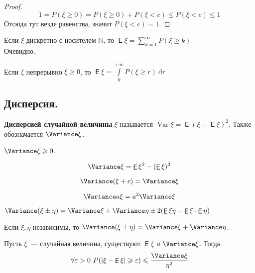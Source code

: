 \documentclass{article}
\DeclareMathOperator{\Expected}{\mathsf{E}}
\begin{document}
    \begin{proof}
        $$
        1=P(\xi\geqslant0)=P(\xi\geqslant0)+P(\xi<c)\leqslant P(\xi<c)\leqslant 1
        $$
        Отсюда тут везде равенства, значит $P(\xi<c)=1$.
    \end{proof}
    \begin{property}
        Если $\xi$ дискретно с носителем $\mathbb N$, то $\Expected\xi=\sum\limits_{k=1}^\infty P(\xi\geqslant k)$.\\
        Очевидно.
    \end{property}
    \begin{property}
        Если $\xi$ непрерывно $\xi\geqslant0$, то $\Expected\xi=\int\limits_0^{+\infty} P(\xi\geqslant r)~\mathrm dr$
    \end{property}
    \subsection{Дисперсия.}
    \begin{definition}
        \textbf{Дисперсией случайной величины} $\xi$ называется $\operatorname{Var}\xi=\Expected(\xi-\Expected\xi)^2$. Также обозначается $\Variance\xi$.
    \end{definition}
    \begin{property}
        $\Variance\xi\geqslant0$.
    \end{property}
    \begin{property}
        $$
        \Variance\xi=\Expected\xi^2-(\Expected\xi)^2
        $$
    \end{property}
    \begin{property}
        $$
        \Variance(\xi+c)=\Variance\xi
        $$
    \end{property}
    \begin{property}
        $$
        \Variance a\xi=a^2\Variance\xi
        $$
    \end{property}
    \begin{property}
        $\Variance(\xi\pm\eta)=\Variance\xi+\Variance\eta\pm 2(\Expected\xi\eta-\Expected\xi\cdot \Expected\eta)$
    \end{property}
    \begin{corollary}
        Если $\xi,\eta$ независимы, то $\Variance(\xi\pm\eta)=\Variance\xi+\Variance\eta$.
    \end{corollary}
    \begin{theorem}
        \label{Неравенство Чебышёва}
        Пусть $\xi$~--- случайная величина, существуют $\Expected\xi$ и $\Variance\xi$. Тогда
        $$
        \forall\varepsilon>0~P(|\xi-\Expected\xi|\geqslant\varepsilon)\leqslant\frac{\Variance\xi}{\eta^2}
        $$
    \end{theorem}
\end{document}
